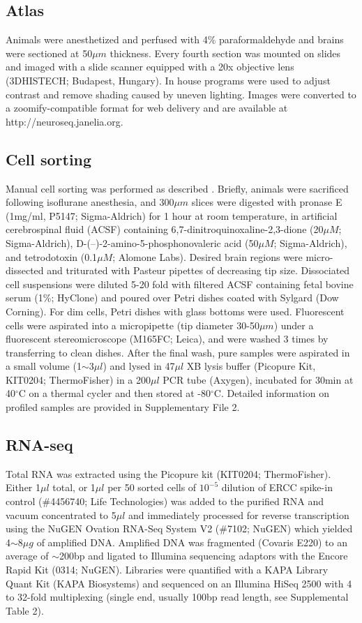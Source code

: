 \subsection{Atlas}
Animals were anesthetized and perfused with 4\% paraformaldehyde and brains were sectioned at 50$\mu m$ thickness. Every fourth section was mounted on slides and imaged with a slide scanner equipped with a 20x objective lens (3DHISTECH; Budapest, Hungary). In house programs were used to adjust contrast and remove shading caused by uneven lighting. Images were converted to a zoomify-compatible format for web delivery and are available at http://neuroseq.janelia.org.

\subsection{Cell sorting}
Manual cell sorting was performed as described \citep{Hempel_2007, Sugino_2014}. Briefly, animals were sacrificed following isoflurane anesthesia, and 300$\mu m$ slices were digested with pronase E (1mg/ml, P5147; Sigma-Aldrich) for 1 hour at room temperature, in artificial cerebrospinal fluid (ACSF) containing 6,7-dinitroquinoxaline-2,3-dione (20$\mu M$; Sigma-Aldrich), D-(–)-2-amino-5-phosphonovaleric acid (50$\mu M$; Sigma-Aldrich), and tetrodotoxin (0.1$\mu M$; Alomone Labs). Desired brain regions were micro-dissected and triturated with Pasteur pipettes of decreasing tip size. Dissociated cell suspensions were diluted 5-20 fold with filtered ACSF containing fetal bovine serum (1\%; HyClone) and poured over Petri dishes coated with Sylgard (Dow Corning). For dim cells, Petri dishes with glass bottoms were used. Fluorescent cells were aspirated into a micropipette (tip diameter 30-50$\mu m$) under a fluorescent stereomicroscope (M165FC; Leica), and were washed 3 times by transferring to clean dishes. After the final wash, pure samples were aspirated in a small volume (1$\sim$3$\mu l$) and lysed in 47$\mu l$ XB lysis buffer (Picopure Kit, KIT0204; ThermoFisher) in a 200$\mu l$ PCR tube (Axygen), incubated for 30min at 40$^{\circ}$C on a thermal cycler and then stored at -80$^{\circ}$C. Detailed information on profiled samples are provided in Supplementary File 2.

\subsection{RNA-seq}
Total RNA was extracted using the Picopure kit (KIT0204; ThermoFisher). Either 1$\mu l$ total, or 1$\mu l$ per 50 sorted cells of $10^{-5}$ dilution of ERCC spike-in control (\#4456740; Life Technologies) was added to the purified RNA and vacuum concentrated to 5$\mu l$ and immediately processed for reverse transcription using the NuGEN Ovation RNA-Seq System V2 (\#7102; NuGEN) which yielded 4$\sim$8$\mu g$ of amplified DNA. Amplified DNA was fragmented (Covaris E220) to an average of $\sim$200bp and ligated to Illumina sequencing adaptors with the Encore Rapid Kit (0314; NuGEN). Libraries were quantified with a KAPA Library Quant Kit (KAPA Biosystems) and sequenced on an Illumina HiSeq 2500 with 4 to 32-fold multiplexing (single end, usually 100bp read length, see Supplemental Table 2).

